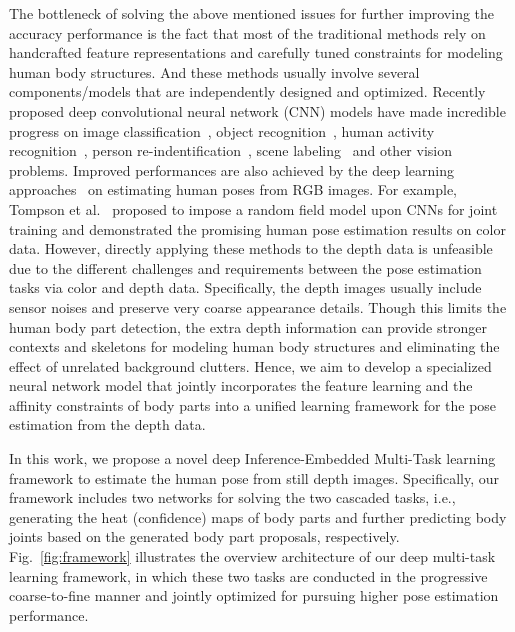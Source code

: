 \documentclass{sig-alternate-05-2015}
\begin{document}
The bottleneck of solving the above mentioned issues for further improving the accuracy performance is the fact that most of the traditional methods rely on handcrafted feature representations and carefully tuned constraints for modeling human body structures. And these methods usually involve several components/models that are independently designed and optimized. Recently proposed deep convolutional neural network (CNN) models have made incredible progress on image classification~\cite{alex12nips, keze2}, object recognition~\cite{alex12nips, rcnn14CVPR, dpl16cvpr, ruimao, xiaodan215iccv}, human activity recognition~\cite{scnn14acmmm, linlang2}, person re-indentification~\cite{guangrun, guangrun2, faqiang}, scene labeling~\cite{xiaodan2, xiaodan3, fullconv, sceneparsing1, sceneparsing2} and other vision problems. Improved performances are also achieved by the deep learning approaches~\cite{fp14eccv, jt14nips} on estimating human poses from RGB images. For example, Tompson et al.~\cite{jt14nips} proposed to impose a random field model upon CNNs for joint training and demonstrated the promising human pose estimation results on color data. However, directly applying these methods to the depth data is unfeasible due to the different challenges and requirements between the pose estimation tasks via color and depth data. Specifically, the depth images usually include sensor noises and preserve very coarse appearance details. Though this limits the human body part detection, the extra depth information can provide stronger contexts and skeletons for modeling human body structures and eliminating the effect of unrelated background clutters. Hence, we aim to develop a specialized neural network model that jointly incorporates the feature learning and the affinity constraints of body parts into a unified learning framework for the pose estimation from the depth data.

In this work, we propose a novel deep Inference-Embedded Multi-Task learning framework to estimate the human pose from still depth images. Specifically, our framework includes two networks for solving the two cascaded tasks, i.e., generating the heat (confidence) maps of body parts and further predicting body joints based on the generated body part proposals, respectively. Fig.~\ref{fig:framework} illustrates the overview architecture of our deep multi-task learning framework, in which these two tasks are conducted in the progressive coarse-to-fine manner and jointly optimized for pursuing higher pose estimation performance. 
\end{document}
